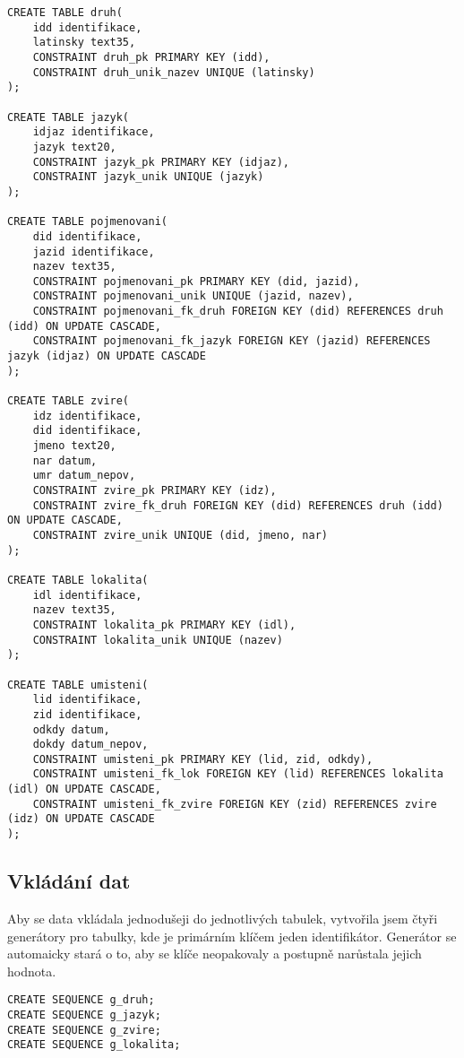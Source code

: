 \documentclass{article}
\begin{document}
\begin{lstlisting}
CREATE TABLE druh(
    idd identifikace, 
    latinsky text35,
    CONSTRAINT druh_pk PRIMARY KEY (idd), 
    CONSTRAINT druh_unik_nazev UNIQUE (latinsky)
);

CREATE TABLE jazyk(
    idjaz identifikace, 
    jazyk text20,
    CONSTRAINT jazyk_pk PRIMARY KEY (idjaz), 
    CONSTRAINT jazyk_unik UNIQUE (jazyk)
);

CREATE TABLE pojmenovani(
    did identifikace,
    jazid identifikace,
    nazev text35,
    CONSTRAINT pojmenovani_pk PRIMARY KEY (did, jazid), 
    CONSTRAINT pojmenovani_unik UNIQUE (jazid, nazev),
    CONSTRAINT pojmenovani_fk_druh FOREIGN KEY (did) REFERENCES druh (idd) ON UPDATE CASCADE, 
    CONSTRAINT pojmenovani_fk_jazyk FOREIGN KEY (jazid) REFERENCES jazyk (idjaz) ON UPDATE CASCADE
);

CREATE TABLE zvire(
    idz identifikace, 
    did identifikace,
    jmeno text20,
    nar datum,
    umr datum_nepov,
    CONSTRAINT zvire_pk PRIMARY KEY (idz), 
    CONSTRAINT zvire_fk_druh FOREIGN KEY (did) REFERENCES druh (idd) ON UPDATE CASCADE, 
    CONSTRAINT zvire_unik UNIQUE (did, jmeno, nar)
);

CREATE TABLE lokalita(
    idl identifikace, 
    nazev text35,
    CONSTRAINT lokalita_pk PRIMARY KEY (idl), 
    CONSTRAINT lokalita_unik UNIQUE (nazev)
);

CREATE TABLE umisteni(
    lid identifikace, 
    zid identifikace,
    odkdy datum,
    dokdy datum_nepov,
    CONSTRAINT umisteni_pk PRIMARY KEY (lid, zid, odkdy), 
    CONSTRAINT umisteni_fk_lok FOREIGN KEY (lid) REFERENCES lokalita (idl) ON UPDATE CASCADE,
    CONSTRAINT umisteni_fk_zvire FOREIGN KEY (zid) REFERENCES zvire (idz) ON UPDATE CASCADE
);
\end{lstlisting}


\subsection{Vkládání dat}

Aby se data vkládala jednodušeji do jednotlivých tabulek, vytvořila jsem čtyři generátory pro tabulky, kde je primárním klíčem jeden identifikátor. Generátor se automaicky stará o to, aby se klíče neopakovaly a postupně narůstala jejich hodnota.

\begin{lstlisting}
CREATE SEQUENCE g_druh;
CREATE SEQUENCE g_jazyk;
CREATE SEQUENCE g_zvire;
CREATE SEQUENCE g_lokalita;
\end{lstlisting}
\end{document}
